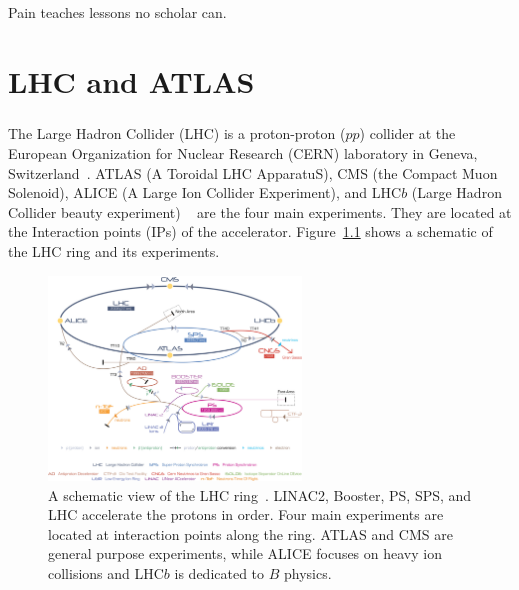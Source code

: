 \begin{savequote}[75mm]
Pain teaches lessons no scholar can.
\end{savequote}

\chapter{LHC and ATLAS}
\paragraph{}
The Large Hadron Collider (LHC) is a proton-proton ($pp$) collider at the European Organization for Nuclear Research (CERN) laboratory in Geneva, Switzerland~\cite{LHCPaper}.  ATLAS (A Toroidal LHC ApparatuS), CMS (the Compact Muon Solenoid), ALICE (A Large Ion Collider Experiment), and LHC$b$ (Large Hadron Collider beauty experiment) ~\cite{ATLASPaper, CMSPaper, LHCbPaper, ALICEPaper} are the four main experiments. They are located at the Interaction points (IPs) of the accelerator. Figure~\ref{fig:LHC} shows a schematic of the LHC ring and its experiments. 

\begin{figure}[htbp!]
  \centering
  \captionsetup{justification=centering}
  \includegraphics[width=0.6\textwidth]{figures/detector/Cern-Accelerator-Complex.jpg}
   \caption{A schematic view of the LHC ring~\cite{LHCReview}. LINAC2, Booster, PS, SPS, and LHC accelerate the protons in order. Four main experiments are located at interaction points along the ring. ATLAS and CMS are general purpose experiments, while ALICE focuses on heavy ion collisions and LHC$b$ is dedicated to $B$ physics.}
  \label{fig:LHC}
\end{figure}

